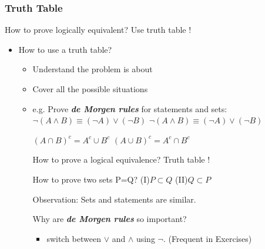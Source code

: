 \documentclass{beamer}
\begin{document}
\begin{frame}
    \frametitle{Truth Table}
    How to prove logically equivalent? Use truth table !
    \begin{itemize}
        \item How to use a truth table?
              \begin{itemize}
                  \item Understand the problem is about
                  \item Cover all the possible situations
                  \item e.g. Prove \textbf{\itshape de Morgen rules} for statements and sets:\\
                        \vspace*{1em}
                        \* \* \* \*
                        $\neg(A\wedge B)\equiv(\neg A)\vee(\neg B)$
                        \* \* \* \* \* \* \* \*
                        $\neg(A\wedge B)\equiv(\neg A)\vee(\neg B)$

                        \vspace*{1em}
                        \* \* \* \*
                        $(A\cap B)^{c}=A^{c}\cup B^{c}$
                        \* \* \* \* \* \* \* \*\*\*
                        $(A\cup B)^{c}=A^{c}\cap B^{c}$

                        \vspace*{1em}

                        How to prove a logical equivalence? Truth table !

                        How to prove two sets P=Q? (I)$P\subset Q$ (II)$Q\subset P$

                        \vspace*{1em}
                        Observation: Sets and statements are similar.

                        Why are \textbf{\itshape de Morgen rules} so important?
                        \begin{itemize}
                            \item switch between $\vee$ and $\wedge$ using $\neg$. (Frequent in Exercises)
                        \end{itemize}
              \end{itemize}
    \end{itemize}
    \vspace*{5em}
\end{frame}

\begin{frame}
\end{frame}
\end{document}
